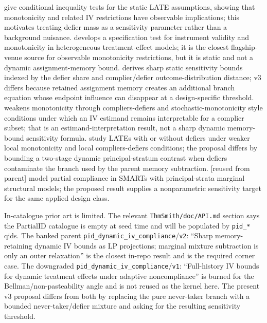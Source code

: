 \documentclass[11pt]{article}
\theoremstyle{definition}
\theoremstyle{plain}
\theoremstyle{remark}
\begin{document}
\citet{MourifieWan2017} give conditional inequality tests for the static LATE assumptions, showing that monotonicity and related IV restrictions have observable implications; this motivates treating defier mass as a sensitivity parameter rather than a background nuisance.  \citet{Kitagawa2015} develops a specification test for instrument validity and monotonicity in heterogeneous treatment-effect models; it is the closest flagship-venue source for observable monotonicity restrictions, but it is static and not a dynamic assignment-memory bound.  \citet{Noack2021} derives sharp static sensitivity bounds indexed by the defier share and complier/defier outcome-distribution distance; v3 differs because retained assignment memory creates an additional branch equation whose endpoint influence can disappear at a design-specific threshold.  \citet{DeChaisemartin2017} weakens monotonicity through compliers-defiers and stochastic-monotonicity style conditions under which an IV estimand remains interpretable for a complier subset; that is an estimand-interpretation result, not a sharp dynamic memory-bound sensitivity formula.  \citet{DahlHuberMellace2023} study LATEs with or without defiers under weaker local monotonicity and local compliers-defiers conditions; the proposal differs by bounding a two-stage dynamic principal-stratum contrast when defiers contaminate the branch used by the parent memory subtraction.  \citet{ArtmanBhattacharyaErtefaieLynchMcKayJohnson2024} [reused from parent] model partial compliance in SMARTs with principal-strata marginal structural models; the proposed result supplies a nonparametric sensitivity target for the same applied design class.

In-catalogue prior art is limited.  The relevant \texttt{ThmSmith/doc/API.md} section says the PartialID catalogue is empty at seed time and will be populated by \texttt{pid\_*} qids.  The banked parent \texttt{pid\_dynamic\_iv\_compliance}/\texttt{v2}: ``Sharp memory-retaining dynamic IV bounds as LP projections; marginal mixture subtraction is only an outer relaxation'' is the closest in-repo result and is the required corner case.  The downgraded \texttt{pid\_dynamic\_iv\_compliance}/\texttt{v1}: ``Full-history IV bounds for dynamic treatment effects under adaptive noncompliance'' is burned for the Bellman/non-pasteability angle and is not reused as the kernel here.  The present v3 proposal differs from both by replacing the pure never-taker branch with a bounded never-taker/defier mixture and asking for the resulting sensitivity threshold.
\end{document}
